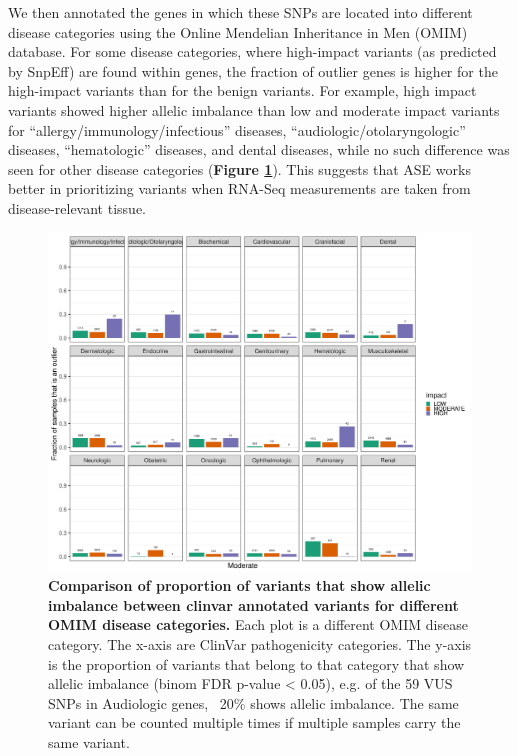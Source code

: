{{We then annotated the genes in which these SNPs are located into different disease categories using the Online Mendelian Inheritance in Men (OMIM) database\cite{hamoshOnlineMendelianInheritance2000}. For some disease categories, where high-impact variants (as predicted by SnpEff\cite{cingolaniProgramAnnotatingPredicting2012}) are found within genes, the fraction of outlier genes is higher for the high-impact variants than for the benign variants. For example, high impact variants showed higher allelic imbalance than low and moderate impact variants for “allergy/immunology/infectious” diseases, “audiologic/otolaryngologic” diseases, “hematologic” diseases, and dental diseases, while no such difference was seen for other disease categories (\textbf{Figure \ref{ase_fig3}}). This suggests that ASE works better in prioritizing variants when RNA-Seq measurements are taken from disease-relevant tissue. 

\begin{figure}[h!]
	\includegraphics[width=\textwidth]{chapters/chapter3-allele-specific-expression/img/fig3.pdf}
	\caption{\textbf{Comparison of proportion of variants that show allelic imbalance between clinvar annotated variants for different OMIM disease categories.} Each plot is a different OMIM disease category. The x-axis are ClinVar pathogenicity categories. The y-axis is the proportion of variants that belong to that category that show allelic imbalance (binom FDR p-value < 0.05), e.g. of the 59 VUS SNPs in Audiologic genes, ~20\% shows allelic imbalance. The same variant can be counted multiple times if multiple samples carry the same variant. }
	\label{ase_fig3}
\end{figure}


}}
